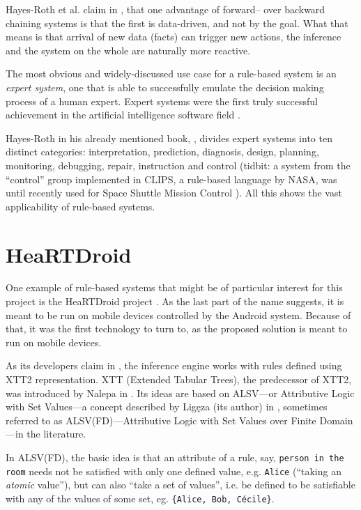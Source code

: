 Hayes-Roth et al. claim in \cite{hayes1984building}, that one advantage of forward-- over backward chaining systems is that the first is data-driven, and not by the goal. What that means is that arrival of new data (facts) can trigger new actions, the inference and the system on the whole are naturally more reactive.

The most obvious and widely-discussed use case for a rule-based system is an \emph{expert system}, one that is able to successfully emulate the decision making process of a human expert. Expert systems were the first truly successful achievement in the artificial intelligence software field \cite{russell1995artificial}.

Hayes-Roth in his already mentioned book, \cite{hayes1984building}, divides expert systems into ten distinct categories: interpretation, prediction, diagnosis, design, planning, monitoring, debugging, repair, instruction and control (tidbit: a system from the ``control'' group implemented in CLIPS, a rule-based language by NASA, was until recently used for Space Shuttle Mission Control \cite{rasmussen1990inco}). All this shows the vast applicability of rule-based systems.

\section{HeaRTDroid}

One example of rule-based systems that might be of particular interest for this project is the HeaRTDroid project \cite{heartdroid}. As the last part of the name suggests, it is meant to be run on mobile devices controlled by the Android system. Because of that, it was the first technology to turn to, as the proposed solution is meant to run on mobile devices.

As its developers claim in \cite{heartdroid}, the inference engine works with rules defined using XTT2 representation. XTT (Extended Tabular Trees), the predecessor of XTT2, was introduced by Nalepa in \cite{nalepa2004new}. Its ideas are based on ALSV---or Attributive Logic with Set Values---a concept described by Ligęza (its author) in \cite{ligeza2006rule}, sometimes referred to as ALSV(FD)---Attributive Logic with Set Values over Finite Domain---in the literature.

In ALSV(FD), the basic idea is that an attribute of a rule, say, \texttt{person in the room} needs not be satisfied with only one defined value, e.g. \texttt{Alice} (``taking an \emph{atomic} value''), but can also ``take a set of values'', i.e. be defined to be satisfiable with any of the values of some set, eg. \texttt{\{Alice, Bob, Cécile\}}.


